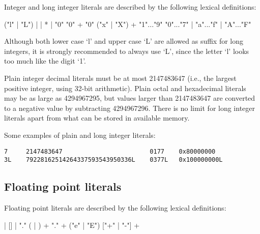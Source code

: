 Integer and long integer literals are described by the following
lexical definitions:

\begin{productionlist}
             { ("l" | "L")}
             { |  | }
             { * | "0"}
             {"0" +}
             {"0" ("x" | "X") +}
             {"1"..."9"}
             {"0"..."7"}
             { | "a"..."f" | "A"..."F"}
\end{productionlist}

Although both lower case `l' and upper case `L' are allowed as suffix
for long integers, it is strongly recommended to always use `L', since
the letter `l' looks too much like the digit `1'.

Plain integer decimal literals must be at most 2147483647 (i.e., the
largest positive integer, using 32-bit arithmetic).  Plain octal and
hexadecimal literals may be as large as 4294967295, but values larger
than 2147483647 are converted to a negative value by subtracting
4294967296.  There is no limit for long integer literals apart from
what can be stored in available memory.

Some examples of plain and long integer literals:

\begin{verbatim}
7     2147483647                        0177    0x80000000
3L    79228162514264337593543950336L    0377L   0x100000000L
\end{verbatim}


\subsection{Floating point literals\label{floating}}

Floating point literals are described by the following lexical
definitions:

\begin{productionlist}
             { | }
             {[]  |  "."}
             {( | )
              }
             {+}
             {"." +}
             {("e" | "E") ["+" | "-"] +}
\end{productionlist}

